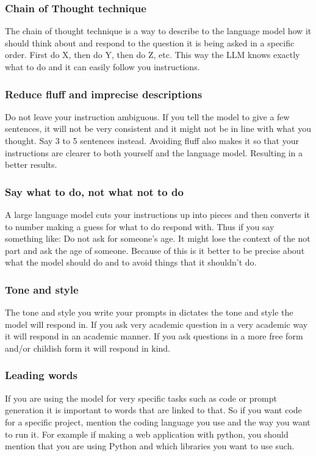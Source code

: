 \subsubsection*{Chain of Thought technique}
The chain of thought technique is a way to describe to the language model how it should think about and respond to the question it is being asked in a specific order. First do X, then do Y, then do Z, etc. This way the LLM knows exactly what to do and it can easily follow you instructions.
\subsubsection*{Reduce fluff and imprecise descriptions}
Do not leave your instruction ambiguous. If you tell the model to give a few sentences, it will not be very consistent and it might not be in line with what you thought. Say 3 to 5 sentences instead. Avoiding fluff also makes it so that your instructions are clearer to both yourself and the language model. Resulting in a better results.
\subsubsection*{Say what to do, not what not to do}
A large language model cuts your instructions up into pieces and then converts it to number making a guess for what to do respond with. Thus if you say something like: Do not ask for someone's age. It might lose the context of the not part and ask the age of someone. Because of this is it better to be precise about what the model should do and to avoid things that it shouldn't do.
\subsubsection*{Tone and style}
The tone and style you write your prompts in dictates the tone and style the model will respond in. If you ask very academic question in a very academic way it will respond in an academic manner. If you ask questions in a more free form and/or childish form it will respond in kind.
\subsubsection*{Leading words}
If you are using the model for very specific tasks such as code or prompt generation it is important to words that are linked to that. So if you want code for a specific project, mention the coding language you use and the way you want to run it. For example if making a web application with python, you should mention that you are using Python and which libraries you want to use such.
